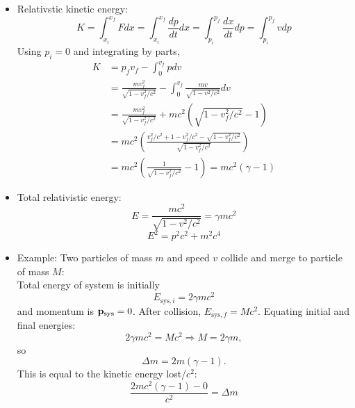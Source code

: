 \documentclass[12pt]{article}
\begin{document}
\begin{itemize}
\item Relativstic kinetic energy:
\begin{equation}
K = \int_{x_i}^{x_f} F dx = \int_{x_i}^{x_f}\frac{dp}{dt}dx =  \int_{p_i}^{p_f}\frac{dx}{dt}{dp} = \int_{p_i}^{p_f} v dp
\end{equation}
Using $p_i = 0$ and integrating by parts, 
\begin{align}
K &= p_fv_f - \int_0^{v_f} p dv \\
&= \frac{mv_f^2}{\sqrt{1 - v_f^2/c^2}} - \int_0^{v_f}\frac{m v}{\sqrt{1 - v^2/c^2}}dv \\
&= \frac{mv_f^2}{\sqrt{1 - v_f^2/c^2}} + mc^2\left(\sqrt{1- v_f^2/c^2} - 1\right) \\
&= mc^2\left(\frac{v_f^2/c^2 + 1 - v_f^2/c^2 - \sqrt{1 - v_f^2/c^2}}{\sqrt{1 - v_f^2/c^2}}\right) \\
&= mc^2\left(\frac{1}{\sqrt{1 - v_f^2/c^2}} - 1\right) = mc^2(\gamma - 1)
\end{align}
\item Total relativistic energy:
\begin{equation}
E = \frac{ mc^2}{\sqrt{1 - v^2/c^2}} = \gamma m c^2
\end{equation}
\begin{equation}
E^2 = p^2 c^2 + m^2 c^4
\end{equation}
\item Example: Two particles of mass $m$ and speed $v$ collide and merge to particle of mass $M$:\\
Total energy of system is initially
\begin{equation}
E_{\text{sys},i} = 2\gamma m c^2
\end{equation}
and momentum is ${\bf p}_\text{sys}  =0$. After collision, $E_{\text{sys},f} = M c^2$. Equating initial and final energies:
\begin{equation}
2\gamma m c^2 = M c^2 \Longrightarrow M = 2 \gamma m,
\end{equation}
so \begin{equation}
\Delta m = 2m(\gamma - 1).
\end{equation}
This is equal to the kinetic energy lost/$c^2$:
\begin{equation}
\frac{2 m c^2(\gamma - 1) - 0}{c^2} = \Delta m
\end{equation}

\end{itemize}
\end{document}
